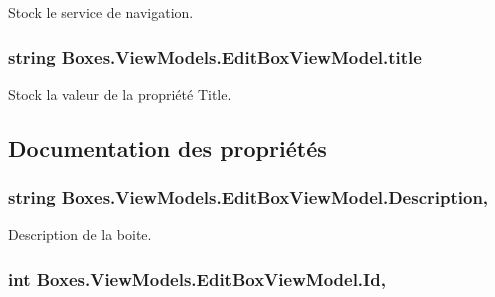 Stock le service de navigation. 

\subsubsection[{\texorpdfstring{title}{title}}]{\setlength{\rightskip}{0pt plus 5cm}string Boxes.\+View\+Models.\+Edit\+Box\+View\+Model.\+title\hspace{0.3cm}{\ttfamily [private]}}\hypertarget{class_boxes_1_1_view_models_1_1_edit_box_view_model_a1726155b5f3c90391303fe6842745f2b}{}\label{class_boxes_1_1_view_models_1_1_edit_box_view_model_a1726155b5f3c90391303fe6842745f2b}


Stock la valeur de la propriété {\ttfamily Title}. 



\subsection{Documentation des propriétés}
\subsubsection[{\texorpdfstring{Description}{Description}}]{\setlength{\rightskip}{0pt plus 5cm}string Boxes.\+View\+Models.\+Edit\+Box\+View\+Model.\+Description\hspace{0.3cm}{\ttfamily [get]}, {\ttfamily [set]}}\hypertarget{class_boxes_1_1_view_models_1_1_edit_box_view_model_a4639fb722a8e57e315ad69ad20906c4a}{}\label{class_boxes_1_1_view_models_1_1_edit_box_view_model_a4639fb722a8e57e315ad69ad20906c4a}


Description de la boite. 

\subsubsection[{\texorpdfstring{Id}{Id}}]{\setlength{\rightskip}{0pt plus 5cm}int Boxes.\+View\+Models.\+Edit\+Box\+View\+Model.\+Id\hspace{0.3cm}{\ttfamily [get]}, {\ttfamily [set]}}\hypertarget{class_boxes_1_1_view_models_1_1_edit_box_view_model_a2fadb1f4b9f62da43e871d6164be76e2}{}\label{class_boxes_1_1_view_models_1_1_edit_box_view_model_a2fadb1f4b9f62da43e871d6164be76e2}


